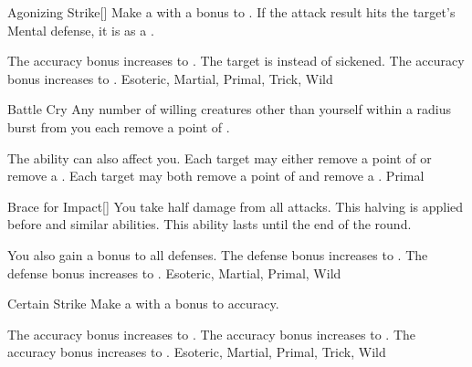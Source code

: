 
\lowercase{\hypertarget{maneuver:Agonizing Strike}{}}\label{maneuver:Agonizing Strike}
\hypertarget{maneuver:Agonizing Strike}{}
\begin{apability}{Agonizing Strike}[]
Make a  with a  bonus to .
If the attack result hits the target's Mental defense,
it is  as a .

\rankline
{} The accuracy bonus increases to .
 The target is  instead of sickened.
 The accuracy bonus increases to .
 Esoteric, Martial, Primal, Trick, Wild
\end{apability}
\vspace{0.25em}



\lowercase{\hypertarget{maneuver:Battle Cry}{}}\label{maneuver:Battle Cry}
\hypertarget{maneuver:Battle Cry}{}
\begin{apability}{Battle Cry}
Any number of willing creatures other than yourself within a \arealarge radius burst from you each remove a point of .

\rankline
{} The ability can also affect you.
 Each target may either remove a point of  or remove a .
 Each target may both remove a point of  and remove a .
 Primal
\end{apability}
\vspace{0.25em}



\lowercase{\hypertarget{maneuver:Brace for Impact}{}}\label{maneuver:Brace for Impact}
\hypertarget{maneuver:Brace for Impact}{}
\begin{freeability}{Brace for Impact}[]
You take half damage from all attacks.
This halving is applied before  and similar abilities.
This ability lasts until the end of the round.

\rankline
{} You also gain a  bonus to all defenses.
 The defense bonus increases to .
 The defense bonus increases to .
 Esoteric, Martial, Primal, Wild
\end{freeability}
\vspace{0.25em}



\lowercase{\hypertarget{maneuver:Certain Strike}{}}\label{maneuver:Certain Strike}
\hypertarget{maneuver:Certain Strike}{}
\begin{apability}{Certain Strike}
Make a  with a  bonus to accuracy.

\rankline
{} The accuracy bonus increases to .
 The accuracy bonus increases to .
 The accuracy bonus increases to .
 Esoteric, Martial, Primal, Trick, Wild
\end{apability}
\vspace{0.25em}



